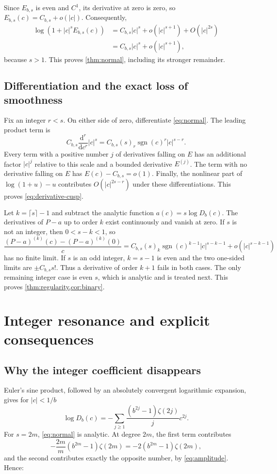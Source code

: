 \documentclass[11pt,a4paper]{article}
\numberwithin{equation}{section}
\theoremstyle{definition}
\theoremstyle{remark}
\newcommand{\sgn}{\operatorname{sgn}}
\begin{document}
Since $E_{b,s}$ is even and $C^1$, its derivative at zero is zero, so
$E_{b,s}(c)=C_{b,s}+o(|c|)$. Consequently,
\begin{align*}
 \log(1+|c|^sE_{b,s}(c))
 &=C_{b,s}|c|^s+o(|c|^{s+1})+O(|c|^{2s})\\
 &=C_{b,s}|c|^s+o(|c|^{s+1}),
\end{align*}
because $s>1$. This proves \cref{thm:normal}, including its stronger
remainder.

\subsection{Differentiation and the exact loss of smoothness}
Fix an integer $r<s$. On either side of zero, differentiate
\cref{eq:normal}. The leading product term is
\[
 C_{b,s}\frac{\mathrm d^r}{\mathrm dc^r}|c|^s
 =C_{b,s}(s)_r\sgn(c)^r|c|^{s-r}.
\]
Every term with a positive number $j$ of derivatives falling on $E$
has an additional factor $|c|^j$ relative to this scale and a bounded
derivative $E^{(j)}$. The term with no derivative falling on $E$ has
$E(c)-C_{b,s}=o(1)$. Finally, the nonlinear part of $\log(1+u)-u$
contributes $O(|c|^{2s-r})$ under these differentiations. This proves
\cref{eq:derivative-cusp}.

Let $k=\lceil s\rceil-1$ and subtract the analytic function
$a(c)=s\log D_b(c)$. The derivatives of $P-a$ up to order $k$ exist
continuously and vanish at zero. If $s$ is not an integer, then
$0<s-k<1$, so
\[
 \frac{(P-a)^{(k)}(c)-(P-a)^{(k)}(0)}{c}
 =C_{b,s}(s)_k\sgn(c)^{k-1}|c|^{s-k-1}
   +o(|c|^{s-k-1})
\]
has no finite limit. If $s$ is an odd integer, $k=s-1$ is even and the
two one-sided limits are $\pm C_{b,s}s!$. Thus a derivative of order
$k+1$ fails in both cases. The only remaining integer case is even $s$,
which is analytic and is treated next. This proves
\cref{thm:regularity,cor:binary}.

\section{Integer resonance and explicit consequences}
\label{sec:integer}

\subsection{Why the integer coefficient disappears}
Euler's sine product, followed by an absolutely convergent logarithmic
expansion, gives for $|c|<1/b$
\begin{equation}
 \log D_b(c)
 =-\sum_{j\ge1}\frac{(b^{2j}-1)\zeta(2j)}{j}c^{2j}.
 \label{eq:log-mask}
\end{equation}
For $s=2m$, \cref{eq:normal} is analytic. At degree $2m$, the first
term contributes
\[
 -\frac{2m}{m}(b^{2m}-1)\zeta(2m)
 =-2(b^{2m}-1)\zeta(2m),
\]
and the second contributes exactly the opposite number, by
\cref{eq:amplitude}. Hence:
\end{document}
